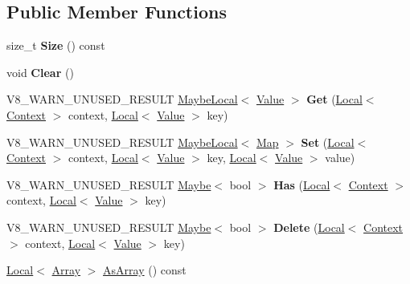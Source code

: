 \subsection*{Public Member Functions}
\begin{DoxyCompactItemize}
\item 
\mbox{\label{classv8_1_1Map_a62cb76161d9a4a62a14e32b2f3f5b490}} 
size\+\_\+t {\bfseries Size} () const
\item 
\mbox{\label{classv8_1_1Map_a06ee0d566d206058a7fe22c140000be4}} 
void {\bfseries Clear} ()
\item 
\mbox{\label{classv8_1_1Map_a18b0a4d81e6900e854ceeabb516b5d72}} 
V8\+\_\+\+W\+A\+R\+N\+\_\+\+U\+N\+U\+S\+E\+D\+\_\+\+R\+E\+S\+U\+LT \mbox{\hyperlink{classv8_1_1MaybeLocal}{Maybe\+Local}}$<$ \mbox{\hyperlink{classv8_1_1Value}{Value}} $>$ {\bfseries Get} (\mbox{\hyperlink{classv8_1_1Local}{Local}}$<$ \mbox{\hyperlink{classv8_1_1Context}{Context}} $>$ context, \mbox{\hyperlink{classv8_1_1Local}{Local}}$<$ \mbox{\hyperlink{classv8_1_1Value}{Value}} $>$ key)
\item 
\mbox{\label{classv8_1_1Map_a46f73b93abc9601a9a90e2051a64bcd3}} 
V8\+\_\+\+W\+A\+R\+N\+\_\+\+U\+N\+U\+S\+E\+D\+\_\+\+R\+E\+S\+U\+LT \mbox{\hyperlink{classv8_1_1MaybeLocal}{Maybe\+Local}}$<$ \mbox{\hyperlink{classv8_1_1Map}{Map}} $>$ {\bfseries Set} (\mbox{\hyperlink{classv8_1_1Local}{Local}}$<$ \mbox{\hyperlink{classv8_1_1Context}{Context}} $>$ context, \mbox{\hyperlink{classv8_1_1Local}{Local}}$<$ \mbox{\hyperlink{classv8_1_1Value}{Value}} $>$ key, \mbox{\hyperlink{classv8_1_1Local}{Local}}$<$ \mbox{\hyperlink{classv8_1_1Value}{Value}} $>$ value)
\item 
\mbox{\label{classv8_1_1Map_abc50dbc81ed6f6eecdb552238b97182b}} 
V8\+\_\+\+W\+A\+R\+N\+\_\+\+U\+N\+U\+S\+E\+D\+\_\+\+R\+E\+S\+U\+LT \mbox{\hyperlink{classv8_1_1Maybe}{Maybe}}$<$ bool $>$ {\bfseries Has} (\mbox{\hyperlink{classv8_1_1Local}{Local}}$<$ \mbox{\hyperlink{classv8_1_1Context}{Context}} $>$ context, \mbox{\hyperlink{classv8_1_1Local}{Local}}$<$ \mbox{\hyperlink{classv8_1_1Value}{Value}} $>$ key)
\item 
\mbox{\label{classv8_1_1Map_a3e587498e1629ae10255f3c2a2beb9dc}} 
V8\+\_\+\+W\+A\+R\+N\+\_\+\+U\+N\+U\+S\+E\+D\+\_\+\+R\+E\+S\+U\+LT \mbox{\hyperlink{classv8_1_1Maybe}{Maybe}}$<$ bool $>$ {\bfseries Delete} (\mbox{\hyperlink{classv8_1_1Local}{Local}}$<$ \mbox{\hyperlink{classv8_1_1Context}{Context}} $>$ context, \mbox{\hyperlink{classv8_1_1Local}{Local}}$<$ \mbox{\hyperlink{classv8_1_1Value}{Value}} $>$ key)
\item 
\mbox{\hyperlink{classv8_1_1Local}{Local}}$<$ \mbox{\hyperlink{classv8_1_1Array}{Array}} $>$ \mbox{\hyperlink{classv8_1_1Map_a924483cc18fa2f287a43ca2d7eaef763}{As\+Array}} () const
\end{DoxyCompactItemize}
